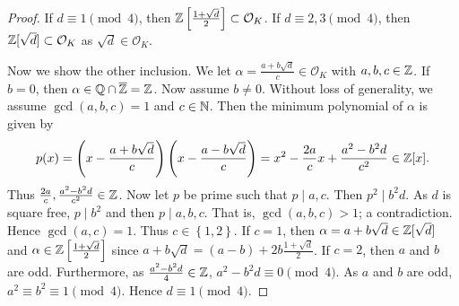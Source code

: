 \begin{proof}
	If $d \equiv 1 \pmod 4$, then 
	$\mathbb{Z}\left[\frac{1+\sqrt d}2\right] \subset \mathcal O_K$.
	If $d \equiv 2,3 \pmod 4$, then $\mathbb{Z}[\sqrt d] \subset \mathcal O_K$ as
	$\sqrt d \in \mathcal O_K$.

	Now we show the other inclusion.
	We let $\alpha = \frac{a + b\sqrt d}c \in \mathcal O_K$ with 
	$a,b,c \in \mathbb{Z}$.
	If $b = 0$, then $\alpha \in \mathbb{Q} \cap \overline{\mathbb{Z}} = \mathbb{Z}$.
	Now assume $b \neq 0$.
	Without loss of generality, we assume $\gcd(a,b,c) = 1$ and
	$c \in \mathbb{N}$.
	Then the minimum polynomial of $\alpha$ is given by
	\[
		p(x) = \left( 
			x - \frac{a + b\sqrt d}c 
		\right) \left( 
			x - \frac{a - b\sqrt d}c 
		\right)
		= x^2 - \frac{2a}c x + \frac{a^2 - b^2d}{c^2}
		\in \mathbb{Z}[x].
	\]
	Thus $\frac{2a}c, \frac{a^2 - b^2d}{c^2} \in \mathbb{Z}$.
	Now let $p$ be prime such that $p \mid a,c$.
	Then $p^2 \mid b^2d$.
	As $d$ is square free, $p \mid b^2$ and then
	$p \mid a,b,c$. 
	That is, $\gcd(a,b,c) > 1$; a contradiction.
	Hence $\gcd(a,c) = 1$.
	Thus $c \in \left\{
		1,2
	\right\}$.
	If $c=1$, then $\alpha = a+b\sqrt d \in \mathbb{Z}[\sqrt d]$ and
	$\alpha \in \mathbb{Z}\left[\frac{1 + \sqrt d}2\right]$ 
	since $a + b\sqrt d = (a - b) + 2b \frac{1 + \sqrt d}2$.
	If $c=2$, then $a$ and $b$ are odd.
	Furthermore, as $\frac{a^2 - b^2d}4 \in \mathbb{Z}$,
	$a^2 - b^2d \equiv 0 \pmod 4$.
	As $a$ and $b$ are odd, $a^2 \equiv b^2 \equiv 1 \pmod 4$.
	Hence $d \equiv 1 \pmod 4$.
\end{proof}

